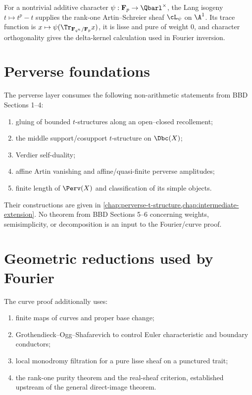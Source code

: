 For a nontrivial additive character
\(\psi:\mathbf F_p\to\Qbarl^\times\), the Lang isogeny
\(t\mapsto t^p-t\) supplies the rank-one Artin--Schreier sheaf
\(\cL_\psi\) on \(\A^1\).  Its trace function is
\(x\mapsto\psi(\Tr_{\mathbf F_{q^n}/\mathbf F_p}x)\), it is lisse and pure of
weight \(0\), and character orthogonality gives the delta-kernel calculation
used in Fourier inversion.

\section{Perverse foundations}

The perverse layer consumes the following non-arithmetic statements from BBD
Sections 1--4:

\begin{enumerate}
\item gluing of bounded \(t\)-structures along an open--closed recollement;
\item the middle support/cosupport \(t\)-structure on \(\Dbc(X)\);
\item Verdier self-duality;
\item affine Artin vanishing and affine/quasi-finite perverse amplitudes;
\item finite length of \(\Perv(X)\) and classification of its simple objects.
\end{enumerate}

Their constructions are given in
\cref{chap:perverse-t-structure,chap:intermediate-extension}.  No theorem from
BBD Sections 5--6 concerning weights, semisimplicity, or decomposition is an
input to the Fourier/curve proof.

\section{Geometric reductions used by Fourier}

The curve proof additionally uses:

\begin{enumerate}
\item finite maps of curves and proper base change;
\item Grothendieck--Ogg--Shafarevich to control Euler characteristic and
      boundary conductors;
\item local monodromy filtration for a pure lisse sheaf on a punctured trait;
\item the rank-one purity theorem and the real-sheaf criterion, established
      upstream of the general direct-image theorem.
\end{enumerate}

